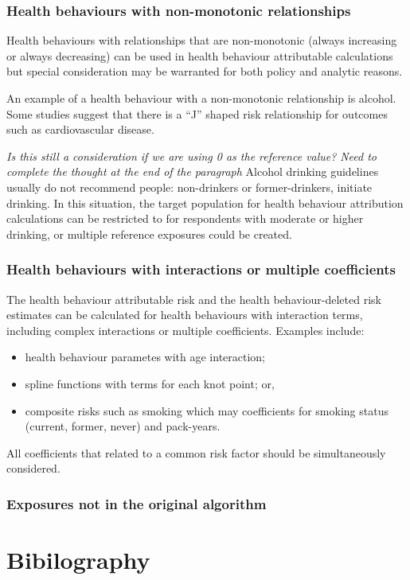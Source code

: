 \documentclass[]{book}
\providecommand{\tightlist}{%
  \setlength{\itemsep}{0pt}\setlength{\parskip}{0pt}}
\begin{document}
\subsection{Health behaviours with non-monotonic
relationships}\label{health-behaviours-with-non-monotonic-relationships}

Health behaviours with relationships that are non-monotonic (always
increasing or always decreasing) can be used in health behaviour
attributable calculations but special consideration may be warranted for
both policy and analytic reasons.

An example of a health behaviour with a non-monotonic relationship is
alcohol. Some studies suggest that there is a ``J'' shaped risk
relationship for outcomes such as cardiovascular disease.

\emph{Is this still a consideration if we are using 0 as the reference
value?} \emph{Need to complete the thought at the end of the paragraph}
Alcohol drinking guidelines usually do not recommend people:
non-drinkers or former-drinkers, initiate drinking. In this situation,
the target population for health behaviour attribution calculations can
be restricted to for respondents with moderate or higher drinking, or
multiple reference exposures could be created.

\subsection{Health behaviours with interactions or multiple
coefficients}\label{health-behaviours-with-interactions-or-multiple-coefficients}

The health behaviour attributable risk and the health behaviour-deleted
risk estimates can be calculated for health behaviours with interaction
terms, including complex interactions or multiple coefficients. Examples
include:

\begin{itemize}
\tightlist
\item
  health behaviour parametes with age interaction;
\item
  spline functions with terms for each knot point; or,
\item
  composite risks such as smoking which may coefficients for smoking
  status (current, former, never) and pack-years.
\end{itemize}

All coefficients that related to a common risk factor should be
simultaneously considered.

\subsection{Exposures not in the original
algorithm}\label{exposures-not-in-the-original-algorithm}

\chapter{Bibilography}\label{bibilography}


\end{document}
